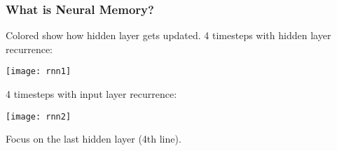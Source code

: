 
\begin{frame}[fragile] \frametitle{What is Neural Memory?}
Colored show how hidden layer gets updated. 
4 timesteps with hidden layer recurrence:
\begin{center}
\texttt{[image: rnn1]}
\end{center}
4 timesteps with input  layer recurrence:
\begin{center}
\texttt{[image: rnn2]}
\end{center}
Focus on the last hidden layer (4th line).
\end{frame}





